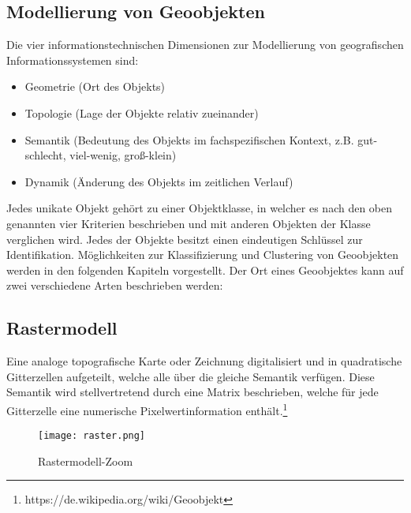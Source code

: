 \documentclass[11pt,fleqn]{book}
\begin{document}
\subsection{Modellierung von Geoobjekten}
Die vier informationstechnischen Dimensionen zur Modellierung von geografischen Informationssystemen sind:
\begin{itemize}
\item Geometrie (Ort des Objekts)
\item Topologie (Lage der Objekte relativ zueinander)
\item Semantik (Bedeutung des Objekts im fachspezifischen Kontext, z.B. gut-schlecht, viel-wenig, groß-klein)
\item Dynamik (Änderung des Objekts im zeitlichen Verlauf)
\end{itemize}
Jedes unikate Objekt gehört zu einer Objektklasse, in welcher es nach den oben genannten vier Kriterien beschrieben und mit anderen Objekten der Klasse verglichen wird. Jedes der Objekte besitzt einen eindeutigen Schlüssel zur Identifikation. Möglichkeiten zur Klassifizierung und Clustering von Geoobjekten werden in den folgenden Kapiteln vorgestellt.\newline
Der Ort eines Geoobjektes kann auf zwei verschiedene Arten beschrieben werden:
\subsection{Rastermodell}
Eine analoge topografische Karte oder Zeichnung digitalisiert und in quadratische Gitterzellen aufgeteilt, welche alle über die gleiche Semantik verfügen. Diese Semantik wird stellvertretend durch eine Matrix beschrieben, welche für jede Gitterzelle eine numerische Pixelwertinformation enthält.\footnote{https://de.wikipedia.org/wiki/Geoobjekt}
\begin{figure}[h]
\centering
\texttt{[image: raster.png]}
\caption{Rastermodell-Zoom \protect\footnotemark}
\end{figure}
\end{document}
